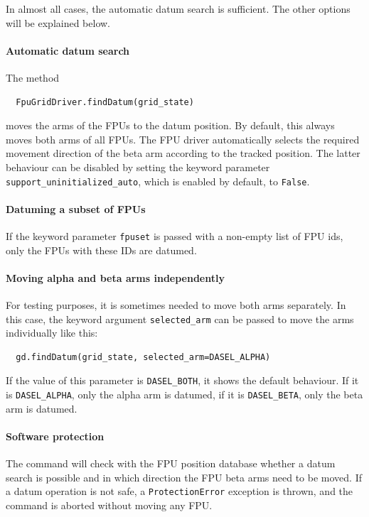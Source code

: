 \documentclass[fontsize=12,a4paper]{scrreprt}
\begin{document}
In almost all cases, the automatic datum search is sufficient.  The
other options will be explained below.

\paragraph{Automatic datum search}

The method
\begin{verbatim}
  FpuGridDriver.findDatum(grid_state)
\end{verbatim}
moves the arms of the FPUs to the datum position.  By default, this
always moves both arms of all FPUs. The FPU driver automatically
selects the required movement direction of the beta arm according to
the tracked position. The latter behaviour can be disabled by setting
the keyword parameter \texttt{support\_uninitialized\_auto}, which is
enabled by default, to \texttt{False}.

\paragraph{Datuming a subset of FPUs}

If the keyword parameter \texttt{fpuset} is passed with a non-empty
list of FPU ids, only the FPUs with these IDs are datumed.


\paragraph{Moving alpha and beta arms independently}

For testing purposes, it is sometimes needed to move both arms
separately.  In this case, the keyword argument
\texttt{selected\_arm} can be passed to move the arms individually
like this:

\begin{verbatim}
  gd.findDatum(grid_state, selected_arm=DASEL_ALPHA)
\end{verbatim}

\begin{sloppypar}
If the value of this parameter is \texttt{DASEL\_BOTH}, it shows the
default behaviour. If it is \texttt{DASEL\_ALPHA}, only the alpha arm
is datumed, if it is \texttt{DASEL\_BETA}, only the beta arm is
datumed.
\end{sloppypar}

\paragraph{Software protection}
The command will check with the FPU position database whether a datum
search is possible and in which direction the FPU beta arms need to be
moved. If a datum operation is not safe, a \texttt{ProtectionError}
exception is thrown, and the command is aborted without moving any
FPU.
\end{document}
